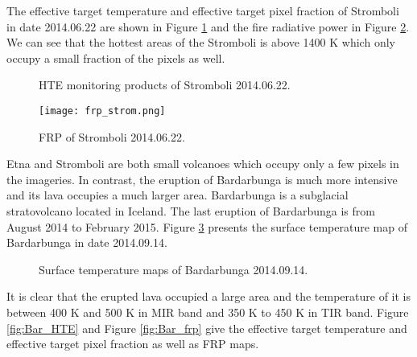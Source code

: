 \noindent The effective target temperature and effective target pixel fraction of Stromboli in date 2014.06.22 are shown in Figure \ref{fig:Strom_HTE} and the fire radiative power in Figure \ref{fig:Strom_frp}. We can see that the hottest areas of the Stromboli is above 1400 K which only occupy a small fraction of the pixels as well.\\

\begin{figure}[!htbp]
\centering
{}
\hspace{0.1in}
\caption{HTE monitoring products of Stromboli 2014.06.22.}
\label{fig:Strom_HTE}
\end{figure}

\begin{figure}[!htbp]
\centering
\texttt{[image: frp\_strom.png]}
\caption{FRP of Stromboli 2014.06.22.}
\label{fig:Strom_frp}
\end{figure}

\noindent Etna and Stromboli are both small volcanoes which occupy only a few pixels in the imageries. In contrast, the eruption of Bardarbunga is much more intensive and its lava occupies a much larger area. Bardarbunga is a subglacial stratovolcano located in Iceland. The last eruption of Bardarbunga is from August 2014 to February 2015. Figure \ref{fig:Bar_sur_tem} presents the surface temperature map of Bardarbunga in date 2014.09.14.\\

\begin{figure}
\centering
{}
\hspace{0.1in}
\caption{Surface temperature maps of Bardarbunga 2014.09.14.}
\label{fig:Bar_sur_tem}
\end{figure}

\noindent It is clear that the erupted lava occupied a large area and the temperature of it is between 400 K and 500 K in MIR band and 350 K to 450 K in TIR band. Figure \ref{fig:Bar_HTE} and Figure \ref{fig:Bar_frp} give the effective target temperature and effective target pixel fraction as well as FRP maps.\\

